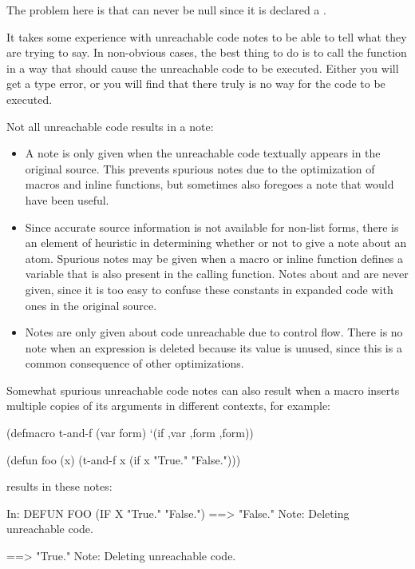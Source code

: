 The problem here is that  can never be null since it is declared a
.

It takes some experience with unreachable code notes to be able to
tell what they are trying to say.  In non-obvious cases, the best
thing to do is to call the function in a way that should cause the
unreachable code to be executed.  Either you will get a type error, or
you will find that there truly is no way for the code to be executed.

Not all unreachable code results in a note:

\begin{itemize} 
\item A note is only given when the unreachable code textually appears
  in the original source.  This prevents spurious notes due to the
  optimization of macros and inline functions, but sometimes also
  foregoes a note that would have been useful.
  
\item Since accurate source information is not available for non-list
  forms, there is an element of heuristic in determining whether or
  not to give a note about an atom.  Spurious notes may be given when
  a macro or inline function defines a variable that is also present
  in the calling function.  Notes about \false{} and \true{} are never
  given, since it is too easy to confuse these constants in expanded
  code with ones in the original source.
  
\item Notes are only given about code unreachable due to control flow.
  There is no note when an expression is deleted because its value is
  unused, since this is a common consequence of other optimizations.
\end{itemize}


Somewhat spurious unreachable code notes can also result when a macro
inserts multiple copies of its arguments in different contexts, for
example:
\begin{lisp}
(defmacro t-and-f (var form)
  `(if ,var ,form ,form))

(defun foo (x)
  (t-and-f x (if x "True." "False.")))
\end{lisp}
results in these notes:
\begin{example}
In: DEFUN FOO
  (IF X "True." "False.")
==>
  "False."
Note: Deleting unreachable code.

==>
  "True."
Note: Deleting unreachable code.
\end{example}

